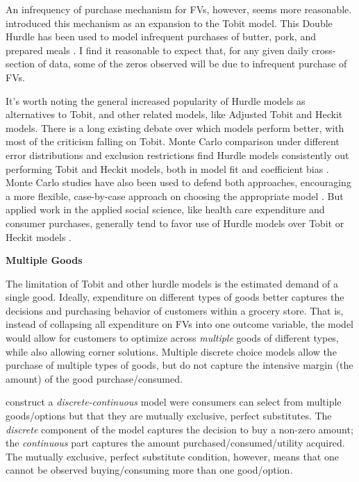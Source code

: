 \documentclass[12pt,letterpaperpaper,]{book}
\begin{document}
An infrequency of purchase mechanism for FVs, however, seems more
reasonable. \citet{deaton_statistical_1984} introduced this mechanism as
an expansion to the Tobit model. This Double Hurdle has been used to
model infrequent purchases of butter, pork, and prepared meals
\citep{yen_modeling_1995, su_microeconometric_1996, newman_double-hurdle_2003}.
I find it reasonable to expect that, for any given daily cross-section
of data, some of the zeros observed will be due to infrequent purchase
of FVs.

It's worth noting the general increased popularity of Hurdle models as
alternatives to Tobit, and other related models, like Adjusted Tobit and
Heckit models. There is a long existing debate over which models perform
better, with most of the criticism falling on Tobit. Monte Carlo
comparison under different error distributions and exclusion
restrictions find Hurdle models consistently out performing Tobit and
Heckit models, both in model fit and coefficient bias
\citep{hay_ordinary_1987, manning_monte_1987}. Monte Carlo studies have
also been used to defend both approaches, encouraging a more flexible,
case-by-case approach on choosing the appropriate model
\citep{leung_choice_1996, dow_choosing_2003, madden_sample_2008}. But
applied work in the applied social science, like health care expenditure
and consumer purchases, generally tend to favor use of Hurdle models
over Tobit or Heckit models
\citep{yen_working_1993, smith_tobit_2003, stewart_tobit_2013}.

\textbf{Multiple Goods}

The limitation of Tobit and other hurdle models is the estimated demand
of a single good. Ideally, expenditure on different types of goods
better captures the decisions and purchasing behavior of customers
within a grocery store. That is, instead of collapsing all expenditure
on FVs into one outcome variable, the model would allow for customers to
optimize across \emph{multiple} goods of different types, while also
allowing corner solutions. Multiple discrete choice models allow the
purchase of multiple types of goods, but do not capture the intensive
margin (the amount) of the good purchase/consumed.

\citet{dubin_econometric_1984} construct a \emph{discrete-continuous}
model were consumers can select from multiple goods/options but that
they are mutually exclusive, perfect substitutes. The \emph{discrete}
component of the model captures the decision to buy a non-zero amount;
the \emph{continuous} part captures the amount
purchased/consumed/utility acquired. The mutually exclusive, perfect
substitute condition, however, means that one cannot be observed
buying/consuming more than one good/option.
\end{document}
